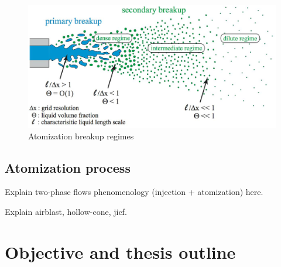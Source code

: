 \begin{figure}[h!]
	\centering
	\includegraphics[scale=0.5]{./part0_intro/atomization-regimes-scheme}
	\caption{Atomization breakup regimes }
	\label{fig:atomization_regimes_herrmann}
\end{figure}

\subsection*{Atomization process}

Explain two-phase flows phenomenology (injection + atomization) here. 

Explain airblast, hollow-cone, jicf.

\section{Objective and thesis outline}

